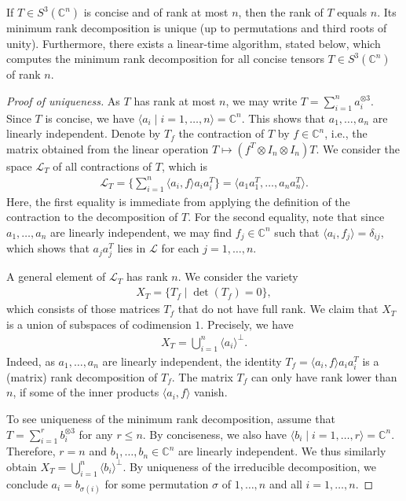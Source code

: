 \begin{theorem}
	\label{tensorAlgorithms-theorem-3tensor}
	If $ T \in S^3(\mathbb C^n) $ is concise and of rank at most $ n $, then the rank of $ T $ equals $ n $. Its minimum rank decomposition is unique (up to permutations and third roots of unity).
	Furthermore, there exists a linear-time algorithm, stated below, which computes the minimum rank decomposition for all concise tensors $ T\in S^3(\mathbb C^n) $ of rank $ n $. 
\end{theorem}
\begin{proof}[Proof of uniqueness]
	As $ T $ has rank at most $ n $, we may write $ T = \sum_{i = 1}^{n} a_i^{\otimes 3} $. Since $ T $ is concise, we have $ \langle a_i \mid i=1,\ldots,n \rangle = \mathbb{C}^n $. This shows that $ a_1,\ldots,a_n $ are linearly independent. Denote by $ T_f $ the contraction of $ T $ by $ f \in \mathbb{C}^n $, i.e., the matrix obtained from the linear operation $ T\mapsto (f^{T} \otimes I_n \otimes I_n) T $. We consider the space $ \mathcal{L}_T $ of all contractions of $ T $, which is
	\begin{align*}
		\mathcal{L}_T = \{\sum_{i = 1}^{n} \langle a_i, f \rangle a_ia_i^{T} \} = \langle a_1a_1^{T},\ldots,a_na_n^{T} \rangle. 
	\end{align*}
	Here, the first equality is immediate from applying the definition of the contraction to the decomposition of $ T $. For the second equality, note that since $ a_1,\ldots,a_n $ are linearly independent, we may find $ f_j\in \mathbb{C}^n $ such that $ \langle a_i, f_j \rangle = \delta_{ij} $, which shows that $ a_ja_j^{T} $ lies in $ \mathcal{L} $ for each $ j = 1,\ldots,n $. 
	
	\smallskip\noindent
	A general element of $ \mathcal{L}_T $ has rank $ n $. We consider the variety 
	\begin{align*}
		X_T = \{T_f \mid \det(T_f) = 0\}, 
	\end{align*}
	which consists of those matrices $ T_f $ that do not have full rank. We claim that $ X_T $ is a union of subspaces of codimension $ 1 $. Precisely, we have 
	\begin{align*}
		X_T = \bigcup_{i = 1}^n \langle a_i \rangle^{\perp}. 
	\end{align*} 
	Indeed, as $ a_1,\ldots,a_n $ are linearly independent, the identity $ T_f = \langle a_i, f \rangle a_ia_i^{T} $ is a (matrix) rank decomposition of $ T_f $. The matrix $ T_f $ can only have rank lower than $ n $, if some of the inner products $ \langle a_i, f \rangle $ vanish. 
	
	To see uniqueness of the minimum rank decomposition, assume that $ T = \sum_{i = 1}^{r} b_i^{\otimes 3} $ for any $ r\le n $. By conciseness, we also have $ \langle b_i \mid i=1,\ldots,r \rangle = \mathbb{C}^n $. Therefore, $ r = n $ and $ b_1,\ldots,b_n\in \mathbb{C}^n $ are linearly independent. We thus similarly obtain $ X_T = \bigcup_{i = 1}^n \langle b_i \rangle^{\perp}$. By uniqueness of the irreducible decomposition, we conclude $ a_i = b_{\sigma(i)} $ for some permutation $ \sigma $ of $ 1,\ldots,n $ and all $ i = 1,\ldots,n $.  
\end{proof}

